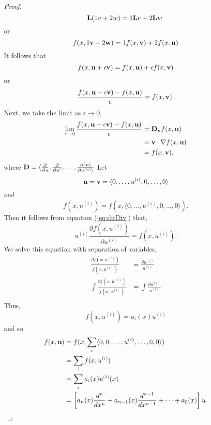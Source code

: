 \begin{proof}
\begin{equation*}
			\mathrm{\bf{L}}(1 v + 2 w) = 1 \mathrm{\bf{L}} v + 2 \mathrm{\bf{L}} w\
	\end{equation*}
	or
	\begin{equation*}
		f(x,1 \textbf{v} + 2 \textbf{w})= 1 f(x, \textbf{v}) + 2 f(x, \textbf{u})
	\end{equation*}
	It follows that 
	\begin{equation*}
		f(x, \textbf{u} + \epsilon \textbf{v}) = f(x, \textbf{u}) + \epsilon f(x, \textbf{v})
	\end{equation*}
	or
	\begin{equation*}
		\frac{f(x, \textbf{u} + \epsilon \textbf{v})-f(x,\textbf{u})}{\epsilon} = f(x,\textbf{v}).
	\end{equation*}
	Next, we take the limit as \(\epsilon \to 0\),
	\begin{equation}\label{eq:dirDiv}
		\begin{split}
			\lim_{\epsilon \to 0}\frac{f(x, \textbf{u} + \epsilon \textbf{v} )-f(x,\textbf{u} )}{\epsilon} &= \mathrm{\bf{D}}_{\textbf{v}} f(x,\textbf{u})\\
			&= \textbf{v} \cdot \nabla f(x,\textbf{u})\\
			&= f(x,\textbf{v}),
		\end{split}
	\end{equation}
	where \(\mathrm{\bf{D}}=\langle \frac{\partial}{\partial u}, \frac{\partial}{\partial u'}, \dots, \frac{\partial^(n)}{\partial u^{(n)}\rangle} \)
	Let 
	\begin{equation*}
		\textbf{u} = \textbf{v} = \langle 0, \dots, u^{(i)}, 0, \dots, 0 \rangle
	\end{equation*}
	and
	\begin{equation*}
		f(x,u^{(i)}) = f(x, \langle 0, \dots, u^{(i)}, 0, \dots, 0 \rangle ).
	\end{equation*}
	Then it follows from equation (\ref{eq:dirDiv}) that,
	\begin{equation*}
		u^{(i)}\frac{\partial f(x, u^{(i)})}{\partial u^{(i)}} = f(x,u^{(i)}).
	\end{equation*}
	We solve this equation with separation of variables, 
	\begin{equation*}
		\begin{split}
			\frac{\partial f(x, u^{(i)})}{f(x,u^{(i)})} &= \frac{\partial u^{(i)}}{u^{(i)}}\\
			\int\frac{\partial f(x, u^{(i)})}{f(x,u^{(i)})} &= \int \frac{\partial u^{(i)}}{u^{(i)}}\\
		\end{split}
	\end{equation*}
	Thus, 
	\begin{equation*}
		f(x,u^{(i)}) = a_i(x)u^{(i)}
	\end{equation*} 
	and so 
	\begin{equation*}
		\begin{split}
			f(x,\textbf{u}) &= f(x, \sum_i \langle 0, 0, \dots, u^{(i)}, \dots, 0, 0 \rangle)\\
			&=\sum_i f(x,u^{(i)}) \\
			&= \sum_i a_i(x)u^{(i)}(x)\\
			&= \left[a_n(x) \frac{d^n}{dx^n} + a_{n-1}(x) \frac{d^{n-1}}{dx^{n-1}} + \cdots + a_0(x)\right]u.
		\end{split}
	\end{equation*}
\end{proof}

